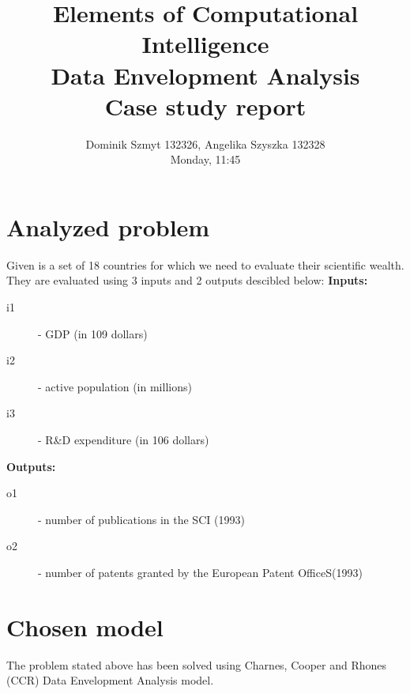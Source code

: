 \documentclass[11pt]{article}
\title{Elements of Computational Intelligence \\ Data Envelopment Analysis \\ Case study report}
\author{Dominik Szmyt 132326, Angelika Szyszka 132328 \\ Monday, 11:45}
\date{}
\begin{document}
\maketitle
\section{Analyzed problem}
Given is a set of 18 countries for which we need to evaluate their scientific wealth. They are evaluated using 3 inputs and 2 outputs descibled below:
\newline \newline
\textbf{Inputs:}
\begin{description}
	\item[i1] - GDP (in 109 dollars)
	\item[i2] - active population (in millions)
	\item[i3] - R\&D expenditure (in 106 dollars) 
\end{description}
\textbf{Outputs:}
\begin{description}
	\item[o1] - number of publications in the SCI (1993)
	\item[o2] - number of patents granted by the European Patent OfficeS(1993)
\end{description}
%
%
\section{Chosen model}
The problem stated above has been solved using Charnes, Cooper and Rhones (CCR) Data Envelopment Analysis model.
%
\pagebreak
%
\end{document}
